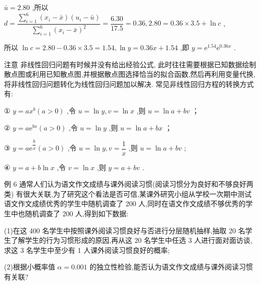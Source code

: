 $\bar{u} = {2.80}$ ,所以 $d = \dfrac{\mathop{\sum }\limits_{{i = 1}}^{6}\left( {{x}_{i} - \bar{x}}\right) \left( {{u}_{i} - \bar{u}}\right) }{\mathop{\sum }\limits_{{i = 1}}^{6}{\left( {x}_{i} - \bar{x}\right) }^{2}} = \dfrac{6.30}{17.5} = {0.36},{2.80} = {0.36} \times  {3.5} + \ln c$ ,

所以 $\ln c = {2.80} - {0.36} \times  {3.5} = {1.54},\ln y = {0.36x} + {1.54}$ ,即 $y = {\mathrm{e}}^{1.54}{\mathrm{e}}^{0.36x}$ .

注意 非线性回归问题有时候并没有给出经验公式, 此时往往需要根据已知数据绘制散点图或利用已知散点图,并根据散点图选择恰当的拟合函数,然后再利用变量代换,将非线性回归问题转化为线性回归问题加以解决. 常见非线性回归方程的转换方式有:

① $y = a{x}^{b}\left( {a > 0}\right)$ ,令 $u = \ln y,v = \ln x$ ,则 $u = \ln a + {bv}$ ；

② $y = a{\mathrm{e}}^{bx}\left( {a > 0}\right)$ ,令 $u = \ln y$ ,则 $u = \ln a + {bx}$ ；

③ $y = a{\mathrm{e}}^{\dfrac{b}{x}}\left( {a > 0}\right)$ ,令 $u = \ln y,v = \dfrac{1}{x}$ ,则 $u = \ln a + {bv}$ ;

④ $y = a + b\ln x$ ,令 $v = \ln x$ ,则 $y = a + {bv}$ .

例 6 通常人们认为语文作文成绩与课外阅读习惯(阅读习惯分为良好和不够良好两类) 有很大关联,为了研究这个看法是否可信,某课外研究小组从学校一次期中测试语文作文成绩优秀的学生中随机调查了 200 人,同时在语文作文成绩不够优秀的学生中也随机调查了 200 人,得到如下数据:

\begin{center}
\end{center}

(1)在这 400 名学生中按照课外阅读习惯良好与否进行分层随机抽样,抽取 20 名学生了解学生的行为习惯形成的原因,再从这 20 名学生中任选 3 人进行面对面访谈,求这 3 名学生中至少有 1 人课外阅读习惯良好的概率;

(2)根据小概率值 $\alpha  = {0.001}$ 的独立性检验,能否认为语文作文成绩与课外阅读习惯有关联?

